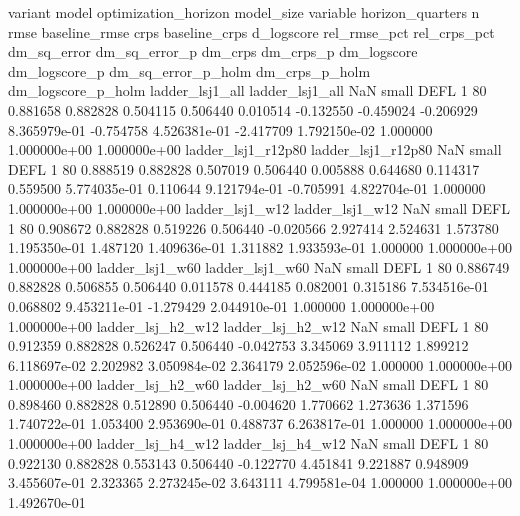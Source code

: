                  variant                    model  optimization_horizon model_size variable  horizon_quarters  n     rmse  baseline_rmse     crps  baseline_crps  d_logscore  rel_rmse_pct  rel_crps_pct  dm_sq_error  dm_sq_error_p   dm_crps    dm_crps_p  dm_logscore  dm_logscore_p  dm_sq_error_p_holm  dm_crps_p_holm  dm_logscore_p_holm
         ladder_lsj1_all          ladder_lsj1_all                   NaN      small     DEFL                 1 80 0.881658       0.882828 0.504115       0.506440    0.010514     -0.132550     -0.459024    -0.206929   8.365979e-01 -0.754758 4.526381e-01    -2.417709   1.792150e-02            1.000000    1.000000e+00        1.000000e+00
      ladder_lsj1_r12p80       ladder_lsj1_r12p80                   NaN      small     DEFL                 1 80 0.888519       0.882828 0.507019       0.506440    0.005888      0.644680      0.114317     0.559500   5.774035e-01  0.110644 9.121794e-01    -0.705991   4.822704e-01            1.000000    1.000000e+00        1.000000e+00
         ladder_lsj1_w12          ladder_lsj1_w12                   NaN      small     DEFL                 1 80 0.908672       0.882828 0.519226       0.506440   -0.020566      2.927414      2.524631     1.573780   1.195350e-01  1.487120 1.409636e-01     1.311882   1.933593e-01            1.000000    1.000000e+00        1.000000e+00
         ladder_lsj1_w60          ladder_lsj1_w60                   NaN      small     DEFL                 1 80 0.886749       0.882828 0.506855       0.506440    0.011578      0.444185      0.082001     0.315186   7.534516e-01  0.068802 9.453211e-01    -1.279429   2.044910e-01            1.000000    1.000000e+00        1.000000e+00
       ladder_lsj_h2_w12        ladder_lsj_h2_w12                   NaN      small     DEFL                 1 80 0.912359       0.882828 0.526247       0.506440   -0.042753      3.345069      3.911112     1.899212   6.118697e-02  2.202982 3.050984e-02     2.364179   2.052596e-02            1.000000    1.000000e+00        1.000000e+00
       ladder_lsj_h2_w60        ladder_lsj_h2_w60                   NaN      small     DEFL                 1 80 0.898460       0.882828 0.512890       0.506440   -0.004620      1.770662      1.273636     1.371596   1.740722e-01  1.053400 2.953690e-01     0.488737   6.263817e-01            1.000000    1.000000e+00        1.000000e+00
       ladder_lsj_h4_w12        ladder_lsj_h4_w12                   NaN      small     DEFL                 1 80 0.922130       0.882828 0.553143       0.506440   -0.122770      4.451841      9.221887     0.948909   3.455607e-01  2.323365 2.273245e-02     3.643111   4.799581e-04            1.000000    1.000000e+00        1.492670e-01
